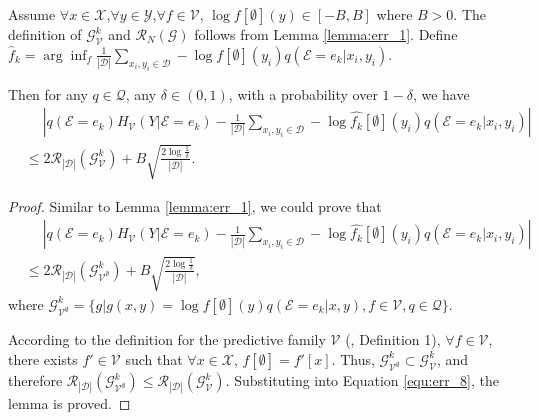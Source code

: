 \begin{lemma}
\label{lemma:err_2}
Assume $\forall x \in \mathcal X$,$\forall y \in \mathcal Y$,$\forall f \in \mathcal V$, $\log f[\emptyset](y) \in [-B,B]$ where $B > 0$. The definition of $\mathcal G_{\mathcal V}^k$ and $\mathscr R_{N}(\mathcal G)$ follows from Lemma \ref{lemma:err_1}. Define $\hat f_k = \arg \inf_f \frac{1}{|\mathcal D|}  \sum_{x_i,y_i \in \mathcal D} -\log f[\emptyset](y_i) q(\mathcal E=e_k|x_i,y_i)$.

Then for any $q \in \mathcal Q$,  any $\delta \in (0,1)$, with a probability over $1 - \delta$,  we have
\begin{align}
    &\quad\; \left|q(\mathcal E=e_k)H_{\mathcal V}(Y|\mathcal E=e_k)  - \frac{1}{|\mathcal D|} \sum_{x_i,y_i \in \mathcal D} -\log \hat{f_k}[\emptyset](y_i) q(\mathcal E=e_k|x_i,y_i) \right| \\
    &\leq 2\mathscr R_{|\mathcal D|}(\mathcal G_{\mathcal V}^k) + B\sqrt{\frac{2\log{\frac{1}{\delta}}}{|\mathcal D|}}.
\end{align}
\end{lemma}
\begin{proof}
Similar to  Lemma \ref{lemma:err_1}, we could prove that
\begin{align}
    \label{equ:err_8}
    &\quad\; \left|q(\mathcal E=e_k)H_{\mathcal V}(Y|\mathcal E=e_k)  - \frac{1}{|\mathcal D|} \sum_{x_i,y_i \in \mathcal D} -\log \hat{f_k}[\emptyset](y_i) q(\mathcal E=e_k|x_i,y_i) \right| \\
    &\leq 2\mathscr R_{|\mathcal D|}(\mathcal G_{\mathcal V^\emptyset}^k) + B\sqrt{\frac{2\log{\frac{1}{\delta}}}{|\mathcal D|}},
\end{align}
where $\mathcal G_{\mathcal V^\emptyset}^k = \{g|g(x,y) = \log f[\emptyset](y)q(\mathcal E=e_k|x,y), f\in \mathcal V, q \in \mathcal Q  \}$.

According to the definition for the predictive family $\mathcal V$ (\cite{DBLP:conf/iclr/XuZSSE20}, Definition 1), $\forall f \in \mathcal V$, there exists $f' \in \mathcal V$ such that $\forall x \in \mathcal X$, $f[\emptyset] = f'[x]$. Thus, $\mathcal G_{\mathcal V^\emptyset}^k \subset \mathcal G_{\mathcal V}^k$, and therefore $\mathscr R_{|\mathcal D|}(\mathcal G_{\mathcal V^\emptyset}^k) \leq \mathscr R_{|\mathcal D|}(\mathcal G_{\mathcal V}^k)$. Substituting into Equation \ref{equ:err_8}, the lemma is proved.
\end{proof}

